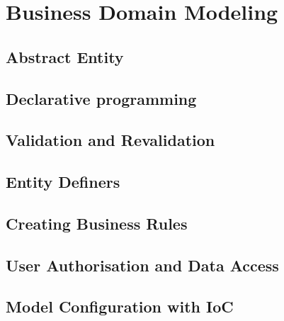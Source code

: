 \chapter{Business Domain Modeling}\label{ch01:02}

\section{Abstract Entity}

\section{Declarative programming}

\section{Validation and Revalidation}

\section{Entity Definers}

\section{Creating Business Rules}

\section{User Authorisation and Data Access}

\section{Model Configuration with IoC}
  